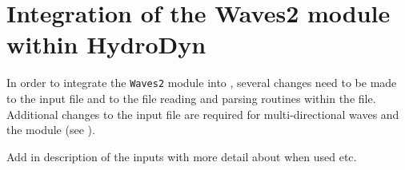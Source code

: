 \chapter{Integration of the Waves2 module within HydroDyn}
\label{chap:Waves2:Integration}

In order to integrate the {\tt Waves2} module into \HD, several changes need to be made to the \HD input file and to the file reading and parsing routines within the  file.  Additional changes to the input file are required for multi-directional waves and the  module (see ).

\begin{center}
   \begin{minipage}[t]{\linewidth}
   \end{minipage}
   \label{tab:HD_Waves2_InputMods}
\end{center}

Add in description of the inputs with more detail about when used etc.


